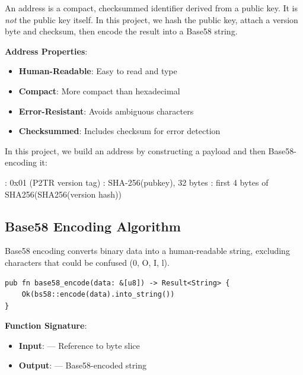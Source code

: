 An address is a compact, checksummed identifier derived from a public key. It is \emph{not} the public key itself. In this project, we hash the public key, attach a version byte and checksum, then encode the result into a Base58 string.

\needspace{2in}
\textbf{Address Properties}:
\begin{itemize}
  \item \textbf{Human-Readable}: Easy to read and type
  \item \textbf{Compact}: More compact than hexadecimal
  \item \textbf{Error-Resistant}: Avoids ambiguous characters
  \item \textbf{Checksummed}: Includes checksum for error detection
\end{itemize}

\begin{infobox}
In this project, we build an address by constructing a payload and then Base58-encoding it:

\noindent
{}

\noindent
{}: 0x01 (P2TR version tag)
\noindent
{}: SHA-256(pubkey), 32 bytes
\noindent
{}: first 4 bytes of SHA256(SHA256(version \textbar{}\textbar{} hash))
\end{infobox}

\subsection{Base58 Encoding Algorithm}
\label{sec:ch08-base58-encoding}

Base58 encoding converts binary data into a human-readable string, excluding characters that could be confused (0, O, I, l).

\begin{listing}[htbp]
\caption{Base58 encoding ()}
\label{lst:ch08-base58-encode}
\begin{verbatim}
pub fn base58_encode(data: &[u8]) -> Result<String> {
    Ok(bs58::encode(data).into_string())
}
\end{verbatim}
\end{listing}

\textbf{Function Signature}:
\begin{itemize}
  \item \textbf{Input}: \code{\&[u8]} --- Reference to byte slice
  \item \textbf{Output}:  --- Base58-encoded string
\end{itemize}


